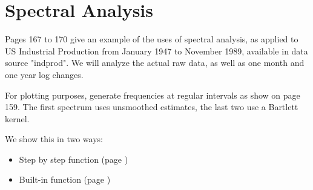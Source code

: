 \documentclass[a4paper]{article}
\begin{document}
\section{Spectral Analysis}
Pages 167 to 170 give an example of the uses of spectral analysis, as applied to US Industrial Production from
January 1947 to November 1989, available in data source "indprod".  We will analyze the actual raw data, as well as
one month and one year log changes.
\begin{Schunk}
\end{Schunk}
For plotting purposes, generate frequencies at regular intervals as show on page 159.  The first
spectrum uses unsmoothed estimates, the last two use a Bartlett kernel.

We show this in two ways:	
\begin{itemize}
\item Step by step function (page \pageref{par:Chap6Man})
\item Built-in function (page \pageref{par:Chap6Auto})
\end{itemize}
\end{document}
